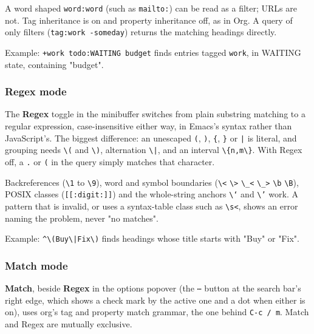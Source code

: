 \documentclass[11pt]{article}
\begin{document}
A word shaped \texttt{word:word} (such as \texttt{mailto:}) can be read as a filter; URLs are not. Tag inheritance is on and property inheritance off, as in Org. A query of only filters (\texttt{tag:work -someday}) returns the matching headings directly.

Example: \texttt{+work todo:WAITING budget} finds entries tagged \texttt{work}, in WAITING state, containing "budget".

\subsubsection{Regex mode}
\label{sec:org56f0a5e}

The \textbf{Regex} toggle in the minibuffer switches from plain substring matching to a regular expression, case-insensitive either way, in Emacs's syntax rather than JavaScript's. The biggest difference: an unescaped \texttt{(}, \texttt{)}, \texttt{\{}, \texttt{\}} or \texttt{|} is literal, and grouping needs \texttt{\textbackslash{}(} and \texttt{\textbackslash{})}, alternation \texttt{\textbackslash{}|}, and an interval \texttt{\textbackslash{}\{n,m\textbackslash{}\}}. With Regex off, a \texttt{.} or \texttt{(} in the query simply matches that character.

Backreferences (\texttt{\textbackslash{}1} to \texttt{\textbackslash{}9}), word and symbol boundaries (\texttt{\textbackslash{}<} \texttt{\textbackslash{}>} \texttt{\textbackslash{}\_<} \texttt{\textbackslash{}\_>} \texttt{\textbackslash{}b} \texttt{\textbackslash{}B}), POSIX classes (\texttt{[[:digit:]]}) and the whole-string anchors \texttt{\textbackslash{}`} and \texttt{\textbackslash{}'} work. A pattern that is invalid, or uses a syntax-table class such as \texttt{\textbackslash{}s<}, shows an error naming the problem, never "no matches".

Example: \texttt{\textasciicircum{}\textbackslash{}(Buy\textbackslash{}|Fix\textbackslash{})} finds headings whose title starts with "Buy" or "Fix".

\subsubsection{Match mode}
\label{sec:org32157d7}

\textbf{Match}, beside \textbf{Regex} in the options popover (the \texttt{⋯} button at the search bar's right edge, which shows a check mark by the active one and a dot when either is on), uses org's tag and property match grammar, the one behind \texttt{C-c / m}. Match and Regex are mutually exclusive.
\end{document}
